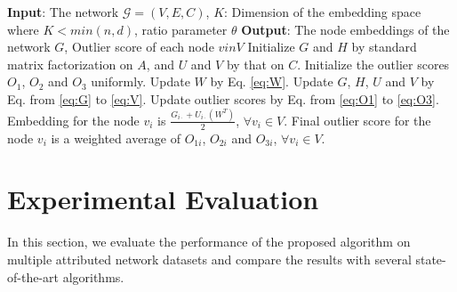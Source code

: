 \documentclass[letterpaper]{article} %
\begin{document}
\begin{algorithm} %
  \caption{\textbf{ONE}}
  \label{alg:oane}
\begin{algorithmic}[1]
      
	\Statex \textbf{Input}: The network $\mathcal{G}=(V,E,C)$, $K$: Dimension of the embedding space where $K<min(n,d)$, ratio parameter $\theta$
    \Statex \textbf{Output}: The node embeddings of the network $G$, Outlier score of each node $v in V$
	\State Initialize $G$ and $H$ by standard matrix factorization on $A$, and $U$ and $V$ by that on $C$.
    \State Initialize the outlier scores $O_1$, $O_2$ and $O_3$ uniformly.
    	\State Update $W$ by Eq. \ref{eq:W}.
		\State Update $G$, $H$, $U$ and $V$ by Eq. from \ref{eq:G} to \ref{eq:V}.
        \State Update outlier scores by Eq. from \ref{eq:O1} to \ref{eq:O3}.
    \EndFor
    \State Embedding for the node $v_i$ is $\frac{G_{i\cdot} + U_{i\cdot} (W^T)}{2}$, $\forall v_i \in V$.
    \State Final outlier score for the node $v_i$ is a weighted average of $O_{1i}$, $O_{2i}$ and $O_{3i}$, $\forall v_i \in V$.
	\end{algorithmic}
  \end{algorithm} %



\section{Experimental Evaluation}
In this section, we evaluate the performance of the proposed algorithm on multiple attributed network datasets and compare the results with several state-of-the-art algorithms.
\end{document}
